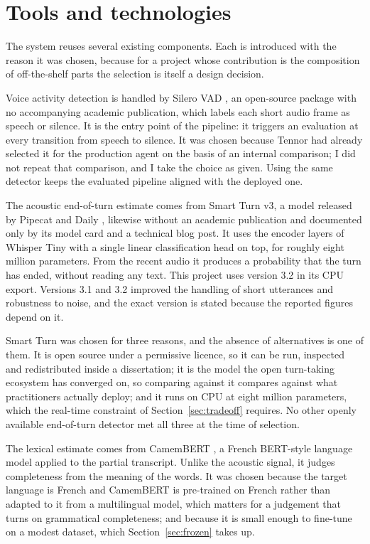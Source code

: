\section{Tools and technologies}
\label{sec:tools}

The system reuses several existing components. Each is introduced with the reason it was
chosen, because for a project whose contribution is the composition of off-the-shelf parts
the selection is itself a design decision.

Voice activity detection is handled by Silero VAD \citep{silero_vad}, an open-source
package with no accompanying academic publication, which labels each short audio frame as
speech or silence. It is the entry point of the pipeline: it triggers an evaluation at every
transition from speech to silence. It was chosen because Tennor had already selected it for
the production agent on the basis of an internal comparison; I did not repeat that
comparison, and I take the choice as given. Using the same detector keeps the evaluated
pipeline aligned with the deployed one.

The acoustic end-of-turn estimate comes from Smart Turn v3, a model released by Pipecat
and Daily \citep{smartturn_v3}, likewise without an academic publication and documented
only by its model card and a technical blog post. It uses the encoder layers of Whisper
Tiny \citep{radford2023whisper} with a single linear classification head on top, for
roughly eight million parameters. From the recent audio it produces a probability that the
turn has ended, without reading any text. This project uses version 3.2 in its CPU export. Versions 3.1 and 3.2 improved the handling
of short utterances and robustness to noise, and the exact version is stated because the
reported figures depend on it.

Smart Turn was chosen for three reasons, and the absence of alternatives is one of them. It
is open source under a permissive licence, so it can be run, inspected and redistributed
inside a dissertation; it is the model the open turn-taking ecosystem has converged on, so
comparing against it compares against what practitioners actually deploy; and it runs on CPU
at eight million parameters, which the real-time constraint of Section~\ref{sec:tradeoff}
requires. No other openly available end-of-turn detector met all three at the time of
selection.

The lexical estimate comes from CamemBERT \citep{martin2020camembert}, a French
BERT-style language model applied to the partial transcript. Unlike the acoustic signal, it
judges completeness from the meaning of the words. It was chosen because the target language
is French and CamemBERT is pre-trained on French rather than adapted to it from a
multilingual model, which matters for a judgement that turns on grammatical completeness;
and because it is small enough to fine-tune on a modest dataset, which Section~\ref{sec:frozen}
takes up.

